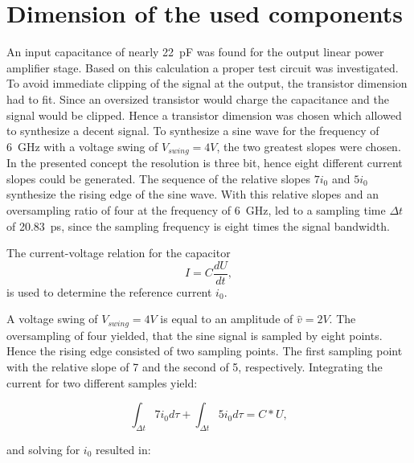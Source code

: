 
\section{Dimension of the used components}
An input capacitance of nearly \SI{22}{\pico \farad} was found for the output linear power amplifier stage.
Based on this calculation a proper test circuit was investigated.
To avoid immediate clipping of the signal at the output, the transistor dimension had to fit.
Since an oversized transistor would charge the capacitance and the signal would be clipped.
Hence a transistor dimension was chosen which allowed to synthesize a decent signal.
To synthesize a sine wave for the frequency of \SI{6}{\giga \hertz} with a voltage swing of $V_{swing} = 4V$, the two greatest slopes were chosen.
In the presented concept the resolution is three bit, hence eight different current slopes could be generated.
The sequence of the relative slopes $7 i_0$ and $5 i_0$ synthesize the rising edge of the sine wave.
With this relative slopes and an oversampling ratio of four at the frequency of \SI{6}{\giga \hertz}, led to a sampling time $\Delta t$ of \SI{20.83}{\pico \second}, since the sampling frequency is eight times the signal bandwidth.

The current-voltage relation for the capacitor
\begin{equation}
	I = C \frac{d U}{d t},
\end{equation}
is used to determine the reference current $i_0$.

A voltage swing of $V_{swing} = 4V$ is equal to an amplitude of $\hat{v} = 2V$.
The oversampling of four yielded, that the sine signal is sampled by eight points.
Hence the rising edge consisted of two sampling points.
The first sampling point with the relative slope of 7 and the second of 5, respectively.
Integrating the current for two different samples yield:

\begin{equation}
\int_{\Delta t} 7 i_0 d\tau + \int_{\Delta t} 5 i_0 d \tau = C*U,
\end{equation}

and solving for $i_0$ resulted in:

